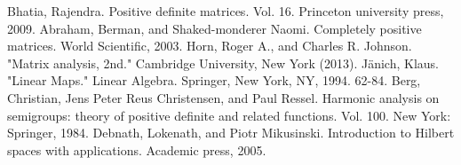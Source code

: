 \newpage
{}
\begin{thebibliography}{9}
        Bhatia, Rajendra. Positive definite matrices. Vol. 16. Princeton university press, 2009.
        Abraham, Berman, and Shaked-monderer Naomi. Completely positive matrices. World Scientific, 2003.
        Horn, Roger A., and Charles R. Johnson. "Matrix analysis, 2nd." Cambridge University, New York (2013).
        Jänich, Klaus. "Linear Maps." Linear Algebra. Springer, New York, NY, 1994. 62-84.
        Berg, Christian, Jens Peter Reus Christensen, and Paul Ressel. Harmonic analysis on semigroups: theory of positive definite and related functions. Vol. 100. New York: Springer, 1984.
        Debnath, Lokenath, and Piotr Mikusinski. Introduction to Hilbert spaces with applications. Academic press, 2005.

\end{thebibliography}

